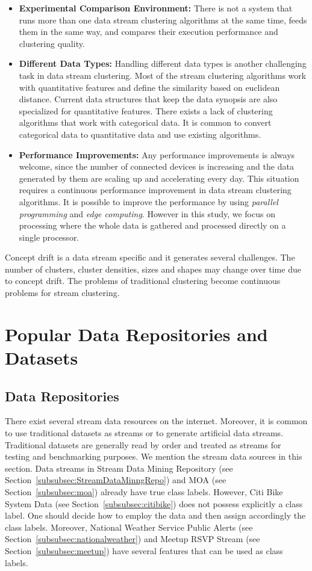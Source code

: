 \documentclass[smallcondensed]{svjour3}     %
\begin{document}
\begin{itemize}
	\item \textbf{Experimental Comparison Environment:} There is not a system that runs more than one data stream clustering algorithms at the same time, feeds them in the same way, and compares their execution performance and clustering quality. 
	\item \textbf{Different Data Types:} Handling different data types is another challenging task in data stream clustering. Most of the stream clustering algorithms work with quantitative features and define the similarity based on euclidean distance. Current data structures that keep the data synopsis are also specialized for quantitative features. There exists a lack of clustering algorithms that work with categorical data. It is common to convert categorical data to quantitative data and use existing algorithms. 
	\item \textbf{Performance Improvements:} Any performance improvements is always welcome, since the number of connected devices is increasing and the data generated by them are scaling up and accelerating every day. This situation requires a continuous performance improvement in data stream clustering algorithms. It is possible to improve the performance by using \textit{parallel programming} and \textit{edge computing}. However in this study, we focus on processing where the whole data is gathered and processed directly on a single processor.
\end{itemize}
Concept drift is a data stream specific and it generates several challenges. The number of clusters, cluster densities, sizes and shapes may change over time due to concept drift. The problems of traditional clustering become continuous problems for stream clustering.

%
\section{Popular Data Repositories and Datasets}
\label{sec:dataReposSets}
\subsection{Data Repositories}
There exist several stream data resources on the internet. Moreover, it is common to use traditional datasets as streams or to generate artificial data streams. Traditional datasets are generally read by order and treated as streams for testing and benchmarking purposes. We mention the stream data sources in this section. Data streams in Stream Data Mining Repository (see Section~\ref{subsubsec:StreamDataMinngRepo}) and MOA (see Section~\ref{subsubsec:moa}) already have true class labels. However, Citi Bike System Data (see Section~\ref{subsubsec:citibike}) does not possess explicitly a class label. One should decide how to employ the data and then assign accordingly the class labels. Moreover, National Weather Service Public Alerts (see Section~\ref{subsubsec:nationalweather}) and Meetup RSVP Stream (see Section~\ref{subsubsec:meetup}) have several features that can be used as class labels.
\end{document}
